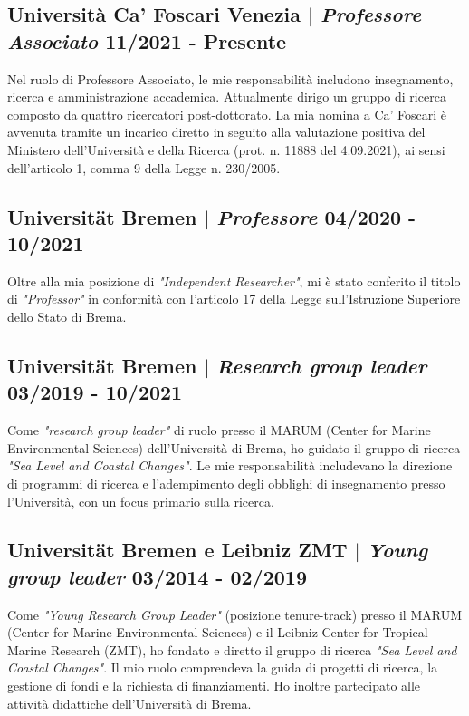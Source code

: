 \documentclass[11pt]{article}
\begin{document}
\bigskip
\subsection{Università Ca' Foscari Venezia $|$ {\normalfont\textit{Professore Associato}} \hfill 11/2021 - Presente}
{\footnotesize Nel ruolo di Professore Associato, le mie responsabilità includono insegnamento, ricerca e amministrazione accademica. Attualmente dirigo un gruppo di ricerca composto da quattro ricercatori post-dottorato. La mia nomina a Ca' Foscari è avvenuta tramite un incarico diretto in seguito alla valutazione positiva del Ministero dell'Università e della Ricerca (prot. n. 11888 del 4.09.2021), ai sensi dell'articolo 1, comma 9 della Legge n. 230/2005.}

\bigskip

\subsection{Universität Bremen $|$ {\normalfont\textit{Professore}} \hfill 04/2020 - 10/2021}
{\footnotesize Oltre alla mia posizione di \textit{"Independent Researcher"}, mi è stato conferito il titolo di \textit{"Professor"} in conformità con l'articolo 17 della Legge sull'Istruzione Superiore dello Stato di Brema.}
\bigskip

\subsection{Universität Bremen $|$ {\normalfont\textit{Research group leader}} \hfill 03/2019 - 10/2021}
{\footnotesize Come \textit{"research group leader"} di ruolo presso il MARUM (Center for Marine Environmental Sciences) dell'Università di Brema, ho guidato il gruppo di ricerca \textit{"Sea Level and Coastal Changes"}. Le mie responsabilità includevano la direzione di programmi di ricerca e l'adempimento degli obblighi di insegnamento presso l'Università, con un focus primario sulla ricerca.}
\bigskip

\subsection{Universität Bremen e Leibniz ZMT $|$ {\normalfont\textit{Young group leader}} \hfill 03/2014 - 02/2019}
{\footnotesize Come \textit{"Young Research Group Leader"} (posizione tenure-track) presso il MARUM (Center for Marine Environmental Sciences) e il Leibniz Center for Tropical Marine Research (ZMT), ho fondato e diretto il gruppo di ricerca \textit{"Sea Level and Coastal Changes"}. Il mio ruolo comprendeva la guida di progetti di ricerca, la gestione di fondi e la richiesta di finanziamenti. Ho inoltre partecipato alle attività didattiche dell'Università di Brema.}
\bigskip
\end{document}
